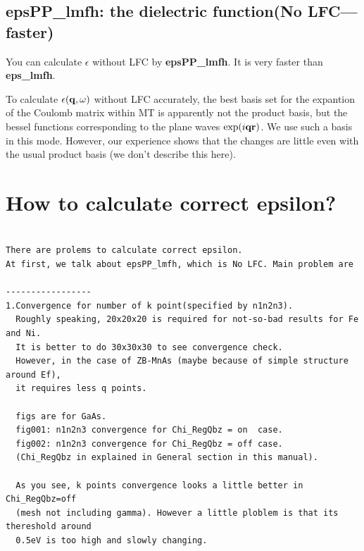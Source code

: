 \documentclass[a4paper,10pt,epsf,fleqn]{article}
\newcommand{\exe}[1]{{\bf #1}}
\begin{document}
{{{%
\subsection{epsPP\_lmfh: the dielectric function(No LFC--- faster)}

You can calculate $\epsilon$ without LFC by
{\bf epsPP\_lmfh}. It is very faster than \exe{eps\_lmfh}.

To calculate $\epsilon({\bf q},\omega)$ without LFC accurately,
the best basis set for the expantion of the Coulomb matrix within MT
is apparently not the product basis, but the bessel functions
corresponding to the plane waves $\exp(i{\bf q r})$.
We use such a basis in this mode. 
However, our experience shows that the changes are little even 
with the usual product basis (we don't describe this here).
%



\section{How to calculate correct epsilon?}

\begin{verbatim}

There are prolems to calculate correct epsilon.
At first, we talk about epsPP_lmfh, which is No LFC. Main problem are 

-----------------
1.Convergence for number of k point(specified by n1n2n3). 
  Roughly speaking, 20x20x20 is required for not-so-bad results for Fe and Ni.
  It is better to do 30x30x30 to see convergence check.
  However, in the case of ZB-MnAs (maybe because of simple structure around Ef),
  it requires less q points.

  figs are for GaAs.
  fig001: n1n2n3 convergence for Chi_RegQbz = on  case.
  fig002: n1n2n3 convergence for Chi_RegQbz = off case.
  (Chi_RegQbz in explained in General section in this manual).

  As you see, k points convergence looks a little better in Chi_RegQbz=off
  (mesh not including gamma). However a little ploblem is that its thereshold around 
  0.5eV is too high and slowly changing.


\end{verbatim}}}}
\end{document}
